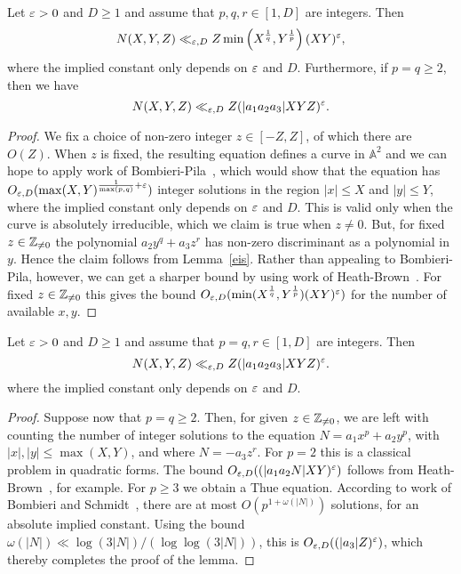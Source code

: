 \begin{lemma}\label{lem:MixedDetMethods}
  Let $\varepsilon>0$ and $D\geq 1$ and
  assume that $p,q,r\in [1,D]$ are integers. Then
  \[
  N(X,Y,Z)\ll_{\varepsilon,D} Z \min\left(X^{\frac{1}{q}}, Y^{\frac{1}{p}} \right) (XY)^\varepsilon,
  \]
  where the implied constant only depends on $\varepsilon$ and $D$. Furthermore,
  if $p=q\geq 2$,
  then we have
  \[
  N(X,Y,Z)\ll_{\varepsilon,D} Z (|a_1a_2a_3|XYZ)^\varepsilon.
  \]
\end{lemma}
\begin{proof}
  We fix a choice of non-zero integer $z\in [-Z,Z]$, of which there are $O(Z)$. When $z$ is fixed, the resulting equation defines a curve in $\mathbb{A}^2$ and we can hope to apply work of Bombieri-Pila~\cite[Theorem~4]{bp}, which would show that the equation has $O_{\varepsilon,D}(\max(X,Y)^{\frac{1}{\max(p,q)}+\varepsilon})$ integer solutions in the region $|x|\leq X$ and $|y|\leq Y$, where the implied constant only depends on $\varepsilon$ and $D$. This is valid only when
  the curve is absolutely irreducible, which we claim is true when $z\neq 0$. But, for fixed $z\in \mathbb{Z}_{\neq 0}$ the
  polynomial $a_2y^q+a_3z^r$ has non-zero discriminant as a polynomial in $y$. Hence the claim follows from Lemma~\ref{eis}. Rather than appealing to Bombieri-Pila, however, we can get a sharper bound by using work of
  Heath-Brown~\cite[Theorem 15]{cime}. For fixed $z\in \mathbb{Z}_{\neq 0}$ this gives the bound
  $O_{\varepsilon,D}(\min(X^{\frac{1}{q}},Y^{\frac{1}{p}})(XY)^\varepsilon)$ for the number of available $x,y$.
\end{proof}

\begin{lemma}\label{lem:MixedThueMethods}
  Let $\varepsilon>0$ and $D\geq 1$ and
  assume that $p=q,r\in [1,D]$ are integers. Then
  \[
  N(X,Y,Z)\ll_{\varepsilon,D} Z (|a_1a_2a_3|XYZ)^\varepsilon.
  \]
  where the implied constant only depends on $\varepsilon$ and $D$.
\end{lemma}
\begin{proof}
  Suppose now that $p=q\geq 2$. Then, for given $z\in \mathbb{Z}_{\neq 0}$, we are left with counting the number of integer solutions to the equation $N=a_1x^p+a_2y^p$, with $|x|,|y|\leq \max(X,Y)$, and
  where $N=-a_3z^r$. For $p=2$ this is a classical problem in quadratic forms. The
  bound $O_{\varepsilon,D}((|a_1a_2N|XY)^\varepsilon)$ follows from Heath-Brown~\cite[Theorem~3]{cubic}, for example.
  For $p\geq 3$ we obtain a Thue equation. According to work of Bombieri and Schmidt~\cite{bs}, there are at most $O(p^{1+\omega(|N|)})$ solutions, for an absolute implied constant. Using the bound $\omega(|N|)\ll \log(3|N|)/(\log \log(3|N|))$, this is $O_{\varepsilon,D}((|a_3|Z)^\varepsilon)$, which thereby completes the proof of the lemma.
\end{proof}

